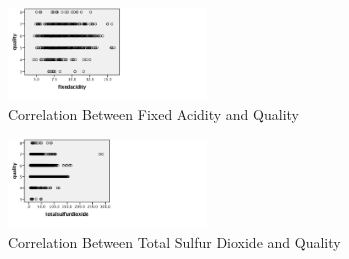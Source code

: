   \begin{figure}[htb]

  \centering  %

  \includegraphics[width=0.47\textwidth]{Picture1.png}

  \caption{Correlation Between Fixed Acidity and Quality}

  \label{fig:tex}

  \end{figure}
   \begin{figure}[htb]

  \centering  %

  \includegraphics[width=0.47\textwidth]{3.png}

  \caption{Correlation Between Total Sulfur Dioxide and Quality}

  \label{fig:tex}

  \end{figure}
  
